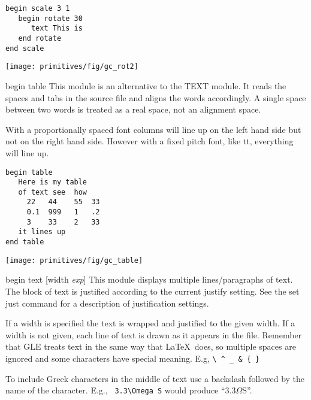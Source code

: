 \begin{commanddescription}
\begin{minipage}[c]{8cm}
\begin{Verbatim}
begin scale 3 1
   begin rotate 30
      text This is
   end rotate
end scale
\end{Verbatim}
\end{minipage}
\hfill
\begin{minipage}[c]{7cm}
\mbox{\texttt{[image: primitives/fig/gc\_rot2]}}
\end{minipage}

\pagebreak[2]

\item[{\sf begin table }]
  This module is an alternative
to the TEXT module.  It reads
the spaces and tabs in the source file and aligns the words
accordingly.  A single space between two words
is treated as a real space, not an alignment space.

With a proportionally spaced font columns will line
up on the left hand side but not on the right hand side.
However with a fixed pitch font, like {\sf tt},
everything will line up.

\begin{minipage}[c]{8cm}
\begin{Verbatim}
begin table
   Here is my table
   of text see  how
     22   44    55  33
     0.1  999   1   .2
     3    33    2   33
   it lines up
end table
\end{Verbatim}
\end{minipage}
\hfill
\begin{minipage}[c]{7cm}
\mbox{\texttt{[image: primitives/fig/gc\_table]}}
\end{minipage}

\item[{\sf begin text [width {\it exp}] }  ]
 This module displays multiple lines/paragraphs of text.
The block of text is justified according to the current justify setting.
See the {\sf set just} command for a description of justification settings.

If a width is specified the text is wrapped and justified
to the given width.  If a width is not given, each line of text
is drawn as it appears in the file.  Remember that GLE treats
text in the same way that \LaTeX \ does, so multiple spaces are ignored
and some characters have special meaning. E.g, \verb#\ ^ _ & { }#

To include Greek characters in the middle of text use a
backslash followed by the name of the character.
E.g., \verb+ 3.3\Omega S+ would produce ``3.3$\Omega$S''.


\end{commanddescription}
